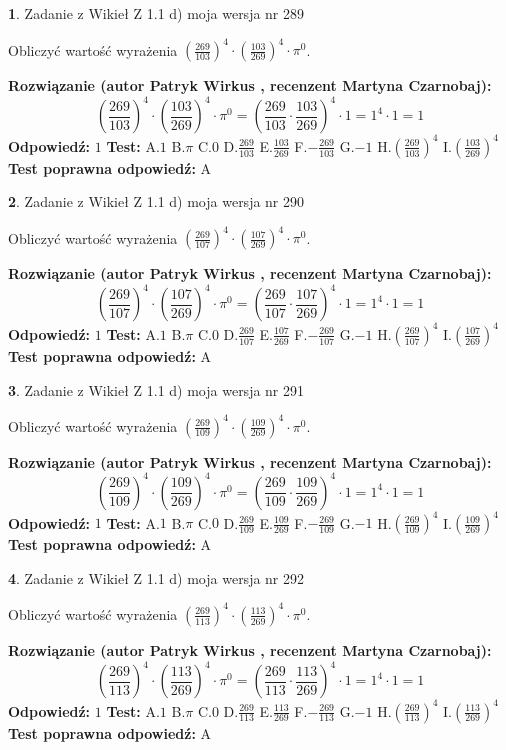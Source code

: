 \documentclass[12pt, a4paper]{article}
\theoremstyle{definition} %
\newtheorem{zad}{}
\newcommand{\zadStart}[1]{\begin{zad}#1\newline}
\newcommand{\zadStop}{\end{zad}}
\newcommand{\rozwStart}[2]{\noindent \textbf{Rozwiązanie (autor #1 , recenzent #2): }\newline}
\newcommand{\rozwStop}{\newline}
\newcommand{\odpStart}{\noindent \textbf{Odpowiedź:}\newline}
\newcommand{\odpStop}{\newline}
\newcommand{\testStart}{\noindent \textbf{Test:}\newline}
\newcommand{\testStop}{\newline}
\newcommand{\kluczStart}{\noindent \textbf{Test poprawna odpowiedź:}\newline}
\newcommand{\kluczStop}{\newline}
\begin{document}
\zadStart{Zadanie z Wikieł Z 1.1 d) moja wersja nr 289}

Obliczyć wartość wyrażenia $(\frac{269}{103})^{4} \cdot (\frac{103}{269})^{4} \cdot \pi^{0}$.
\zadStop
\rozwStart{Patryk Wirkus}{Martyna Czarnobaj}
$$(\frac{269}{103})^{4} \cdot (\frac{103}{269})^{4} \cdot \pi^{0} = (\frac{269}{103} \cdot \frac{103}{269})^{4} \cdot 1 = 1^{4} \cdot 1 = 1$$
\rozwStop
\odpStart
$1$
\odpStop
\testStart
A.$1$ B.$\pi$ C.$0$ D.$\frac{269}{103}$ E.$\frac{103}{269}$
F.$-\frac{269}{103}$ G.$-1$
H.$(\frac{269}{103})^{4}$
I.$(\frac{103}{269})^{4}$
\testStop
\kluczStart
A
\kluczStop



\zadStart{Zadanie z Wikieł Z 1.1 d) moja wersja nr 290}

Obliczyć wartość wyrażenia $(\frac{269}{107})^{4} \cdot (\frac{107}{269})^{4} \cdot \pi^{0}$.
\zadStop
\rozwStart{Patryk Wirkus}{Martyna Czarnobaj}
$$(\frac{269}{107})^{4} \cdot (\frac{107}{269})^{4} \cdot \pi^{0} = (\frac{269}{107} \cdot \frac{107}{269})^{4} \cdot 1 = 1^{4} \cdot 1 = 1$$
\rozwStop
\odpStart
$1$
\odpStop
\testStart
A.$1$ B.$\pi$ C.$0$ D.$\frac{269}{107}$ E.$\frac{107}{269}$
F.$-\frac{269}{107}$ G.$-1$
H.$(\frac{269}{107})^{4}$
I.$(\frac{107}{269})^{4}$
\testStop
\kluczStart
A
\kluczStop



\zadStart{Zadanie z Wikieł Z 1.1 d) moja wersja nr 291}

Obliczyć wartość wyrażenia $(\frac{269}{109})^{4} \cdot (\frac{109}{269})^{4} \cdot \pi^{0}$.
\zadStop
\rozwStart{Patryk Wirkus}{Martyna Czarnobaj}
$$(\frac{269}{109})^{4} \cdot (\frac{109}{269})^{4} \cdot \pi^{0} = (\frac{269}{109} \cdot \frac{109}{269})^{4} \cdot 1 = 1^{4} \cdot 1 = 1$$
\rozwStop
\odpStart
$1$
\odpStop
\testStart
A.$1$ B.$\pi$ C.$0$ D.$\frac{269}{109}$ E.$\frac{109}{269}$
F.$-\frac{269}{109}$ G.$-1$
H.$(\frac{269}{109})^{4}$
I.$(\frac{109}{269})^{4}$
\testStop
\kluczStart
A
\kluczStop



\zadStart{Zadanie z Wikieł Z 1.1 d) moja wersja nr 292}

Obliczyć wartość wyrażenia $(\frac{269}{113})^{4} \cdot (\frac{113}{269})^{4} \cdot \pi^{0}$.
\zadStop
\rozwStart{Patryk Wirkus}{Martyna Czarnobaj}
$$(\frac{269}{113})^{4} \cdot (\frac{113}{269})^{4} \cdot \pi^{0} = (\frac{269}{113} \cdot \frac{113}{269})^{4} \cdot 1 = 1^{4} \cdot 1 = 1$$
\rozwStop
\odpStart
$1$
\odpStop
\testStart
A.$1$ B.$\pi$ C.$0$ D.$\frac{269}{113}$ E.$\frac{113}{269}$
F.$-\frac{269}{113}$ G.$-1$
H.$(\frac{269}{113})^{4}$
I.$(\frac{113}{269})^{4}$
\testStop
\kluczStart
A
\kluczStop
\end{document}
